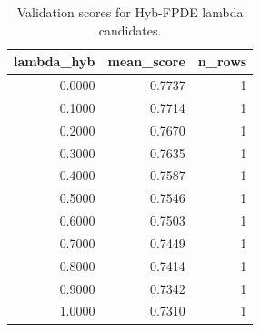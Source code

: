 \begin{table}[t]
\caption{Validation scores for Hyb-FPDE lambda candidates.}
\label{tab:lambda_distribution_computed}
\centering
\begin{tabular}{rrr}
\toprule
lambda\_hyb & mean\_score & n\_rows \\
\midrule
0.0000 & 0.7737 & 1 \\
0.1000 & 0.7714 & 1 \\
0.2000 & 0.7670 & 1 \\
0.3000 & 0.7635 & 1 \\
0.4000 & 0.7587 & 1 \\
0.5000 & 0.7546 & 1 \\
0.6000 & 0.7503 & 1 \\
0.7000 & 0.7449 & 1 \\
0.8000 & 0.7414 & 1 \\
0.9000 & 0.7342 & 1 \\
1.0000 & 0.7310 & 1 \\
\bottomrule
\end{tabular}

\end{table}
